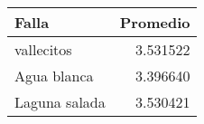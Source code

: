 \begin{tabular}{lr}
\toprule
        Falla &  Promedio \\
\midrule
   vallecitos &  3.531522 \\
  Agua blanca &  3.396640 \\
Laguna salada &  3.530421 \\
\bottomrule
\end{tabular}

